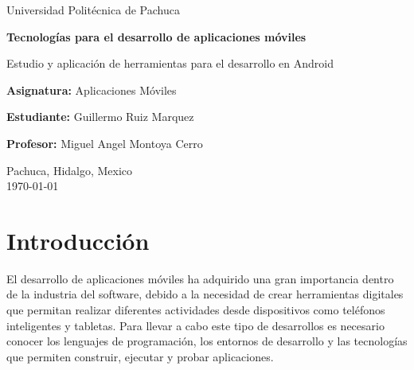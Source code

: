 \documentclass[12pt,a4paper]{article}
\begin{document}
	
	
	\begin{titlepage}
		\centering
		
		\vspace*{2cm}
		
		{\Large Universidad Politécnica de Pachuca\par}
		
		\vspace{2cm}
		
		{\huge\bfseries Tecnologías para el desarrollo de aplicaciones 
			móviles\par}
		
		\vspace{0.5cm}
		
		{\Large Estudio y aplicación de herramientas para 
			el desarrollo en Android\par}
		
		\vspace{2cm}
		
		
		
		\begin{flushleft}
			\textbf{Asignatura:} Aplicaciones Móviles
			
			\vspace{0.5cm}
			
			\textbf{Estudiante:} Guillermo Ruiz Marquez
			
			\vspace{0.5cm}
			
			\textbf{Profesor:} Miguel Angel Montoya Cerro 
		\end{flushleft}
		
		\vfill
		
		Pachuca, Hidalgo, Mexico\\
		\today
		
	\end{titlepage}
	\tableofcontents
	
	\newpage 
	\listoffigures
	
	\newpage 
	\listoftables

	\newpage

\section{Introducción}

El desarrollo de aplicaciones móviles ha adquirido una gran
importancia dentro de la industria del software, debido a la
necesidad de crear herramientas digitales que permitan realizar
diferentes actividades desde dispositivos como teléfonos
inteligentes y tabletas. Para llevar a cabo este tipo de
desarrollos es necesario conocer los lenguajes de programación,
los entornos de desarrollo y las tecnologías que permiten
construir, ejecutar y probar aplicaciones.
\end{document}
